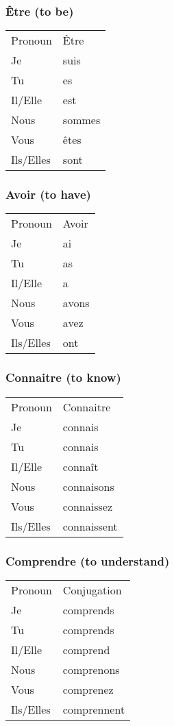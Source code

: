 \subsubsection{\^Etre (to be)}
\begin{tabular}{| l | l |}
\hline
Pronoun 	& 	\^Etre	\\
Je		&	suis	\\
Tu		&	es	\\
Il/Elle		&	est	\\
Nous		&	sommes	\\
Vous		&	\^etes	\\
Ils/Elles	&	sont	\\
\hline
\end{tabular}

\subsubsection{Avoir (to have)}
\begin{tabular}{| l | l |}
\hline
Pronoun 	& 	Avoir	\\
Je		&	ai	\\
Tu		&	as	\\
Il/Elle		&	a	\\
Nous		&	avons	\\
Vous		&	avez	\\
Ils/Elles	&	ont	\\
\hline
\end{tabular}

\subsubsection{Connaitre (to know)}
\begin{tabular}{| l | l |}
\hline
Pronoun 	& 	Connaitre	\\
Je		&	connais		\\
Tu		&	connais		\\
Il/Elle		&	conna\^it	\\
Nous		&	connaisons	\\
Vous		&	connaissez	\\
Ils/Elles	&	connaissent	\\
\hline
\end{tabular}

\subsubsection{Comprendre (to understand)}
\begin{tabular}{| l | l |}
\hline
Pronoun 	& 	Conjugation	\\
Je		&	comprends	\\
Tu		&	comprends	\\
Il/Elle		&	comprend	\\
Nous		&	comprenons	\\
Vous		&	comprenez	\\
Ils/Elles	&	comprennent	\\
\hline
\end{tabular}

